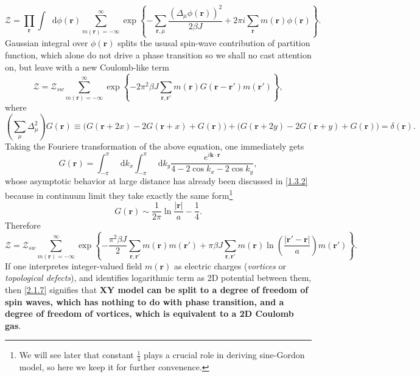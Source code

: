 \documentclass[10pt,nofootinbib]{revtex4}
\newcommand*\dd{\mathop{}\!\mathrm{d}}
\def\Z{\mathcal{Z}}
\begin{document}
		\begin{equation}\label{2.1.6}
			\Z=\prod_{\bm{r}}\int\dd\phi(\bm{r})\sum_{m(\bm{r})=-\infty}^\infty\exp \left\{-\sum_{\bm{r},\mu}\dfrac{(\Delta_\mu \phi(\bm{r}))^2}{2\beta J}+2\pi i\sum_{\bm{r}}m(\bm{r})\phi(\bm{r})\right\}.
		\end{equation}
		Gaussian integral over $\phi(\bm{r})$ splits the ususal spin-wave contribution of partition function, which alone do not drive a phase transition so we shall no cast attention on, but leave with a new Coulomb-like term
		\begin{equation*}
			\Z=\Z_{sw}\sum_{m(\bm{r})=-\infty}^\infty\exp \left\{-2\pi^2\beta J\sum_{\bm{r},\bm{r'}}m(\bm{r})G(\bm{r}-\bm{r'})m(\bm{r'})\right\},
		\end{equation*}
		where
		\begin{equation*}
			\left(\sum_\mu\Delta_\mu^2\right)G(\bm{r})\equiv \bigg(G(\bm{r}+2x)-2G(\bm{r}+x)+G(\bm{r})\bigg)+\bigg(G(\bm{r}+2y)-2G(\bm{r}+y)+G(\bm{r})\bigg)=\delta(\bm{r}).
		\end{equation*}
		Taking the Fouriere transformation of the above equation, one immediately gets
		\begin{equation*}
			G(\bm{r})=\int_{-\pi}^\pi\dd k_x\int_{-\pi}^\pi\dd k_y\dfrac{e^{i\bm{k}\cdot\bm{r}}}{4-2\cos k_x-2\cos k_y},
		\end{equation*}
		whose asymptotic behavior at large distance has already been discussed in \eqref{1.3.2} because in continuum limit they take exactly the same form\footnote{We will see later that constant $\frac{1}{4}$ plays a crucial role in deriving sine-Gordon model, so here we keep it for further convenence.}
		\begin{equation*}
			G(\bm{r})\sim\dfrac{1}{2\pi}\ln\dfrac{|\bm{r}|}{a}-\dfrac{1}{4}.
		\end{equation*}
		Therefore
		\begin{equation}\label{2.1.7}
			\Z=\Z_{sw}\sum_{m(\bm{r})=-\infty}^\infty\exp \left\{-\dfrac{\pi^2\beta J}{2}\sum_{\bm{r},\bm{r'}}m(\bm{r})m(\bm{r'})+\pi\beta J\sum_{\bm{r},\bm{r'}}m(\bm{r})\ln\left(\dfrac{|\bm{r'}-\bm{r}|}{a}\right)m(\bm{r'})\right\}.
		\end{equation}
		If one interpretes integer-valued field $m(\bm{r})$ as electric charges (\emph{vortices} or \emph{topological defects}), and identifies logarithmic term as 2D potential between them, then \eqref{2.1.7} signifies that \textbf{XY model can be split to a degree of freedom of spin waves, which has nothing to do with phase transition, and a degree of freedom of vortices, which is equivalent to a 2D Coulomb gas}.\par
\end{document}
